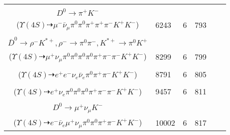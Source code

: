 \documentclass[landscape]{article}
\newcounter{rownumbers}
\newcommand\rn{\stepcounter{rownumbers}\arabic{rownumbers}}
\newcommand{\EOLP}{\\ \hline} %
\newcommand{\topoTags}[1]{#1} %
\begin{document}
\begin{longtable}{clcccc}
\rn & \makecell[l]{ $ 
\Upsilon(4S) \rightarrow B^{+} B^{-} ,
B^{+} \rightarrow \rho^{+} \bar{D}^{0} ,
B^{-} \rightarrow \mu^{-} \bar{\nu}_{\mu} D^{*0} ,
\rho^{+} \rightarrow \pi^{0} \pi^{+} ,
\bar{D}^{0} \rightarrow \pi^{-} K^{+} ,
D^{*0} \rightarrow \pi^{0} D^{0} ,
$ \\ $
D^{0} \rightarrow \pi^{+} K^{-} 
$ \\ ($
\Upsilon(4S) \dashrightarrow \mu^{-} \bar{\nu}_{\mu} \pi^{0} \pi^{0} \pi^{+} \pi^{+} \pi^{-} K^{+} K^{-} 
$) } & \topoTags{6243 & }6 & 793 \EOLP

\rn & \makecell[l]{ $ 
\Upsilon(4S) \rightarrow B^{+} B^{-} ,
B^{+} \rightarrow \mu^{+} \nu_{\mu} \bar{D}^{*0} ,
B^{-} \rightarrow \rho^{-} D^{0} ,
\bar{D}^{*0} \rightarrow \pi^{0} \bar{D}^{0} ,
\rho^{-} \rightarrow \pi^{0} \pi^{-} ,
D^{0} \rightarrow \pi^{+} K^{-} ,
$ \\ $
\bar{D}^{0} \rightarrow \rho^{-} K^{*+} ,
\rho^{-} \rightarrow \pi^{0} \pi^{-} ,
K^{*+} \rightarrow \pi^{0} K^{+} 
$ \\ ($
\Upsilon(4S) \dashrightarrow \mu^{+} \nu_{\mu} \pi^{0} \pi^{0} \pi^{0} \pi^{0} \pi^{+} \pi^{-} \pi^{-} K^{+} K^{-} 
$) } & \topoTags{8299 & }6 & 799 \EOLP

\rn & \makecell[l]{ $ 
\Upsilon(4S) \rightarrow B^{+} B^{-} ,
B^{+} \rightarrow e^{+} \nu_{e} \bar{D}^{0} ,
B^{-} \rightarrow \rho^{-} D^{0} ,
\bar{D}^{0} \rightarrow e^{-} \bar{\nu}_{e} K^{+} ,
\rho^{-} \rightarrow \pi^{0} \pi^{-} ,
D^{0} \rightarrow \pi^{+} K^{-} 
$ \\ ($
\Upsilon(4S) \dashrightarrow e^{+} e^{-} \nu_{e} \bar{\nu}_{e} \pi^{0} \pi^{+} \pi^{-} K^{+} K^{-} 
$) } & \topoTags{8791 & }6 & 805 \EOLP

\rn & \makecell[l]{ $ 
\Upsilon(4S) \rightarrow B^{+} B^{-} ,
B^{+} \rightarrow e^{+} \nu_{e} \bar{D}^{0} ,
B^{-} \rightarrow \rho^{-} D^{0} ,
\bar{D}^{0} \rightarrow \pi^{0} \pi^{-} K^{+} ,
\rho^{-} \rightarrow \pi^{0} \pi^{-} ,
D^{0} \rightarrow \pi^{0} \pi^{+} K^{-} 
$ \\ ($
\Upsilon(4S) \dashrightarrow e^{+} \nu_{e} \pi^{0} \pi^{0} \pi^{0} \pi^{+} \pi^{-} \pi^{-} K^{+} K^{-} 
$) } & \topoTags{9457 & }6 & 811 \EOLP

\rn & \makecell[l]{ $ 
\Upsilon(4S) \rightarrow B^{+} B^{-} ,
B^{+} \rightarrow \rho^{+} \bar{D}^{0} ,
B^{-} \rightarrow e^{-} \bar{\nu}_{e} D^{*0} ,
\rho^{+} \rightarrow \pi^{0} \pi^{+} ,
\bar{D}^{0} \rightarrow \pi^{-} K^{+} ,
D^{*0} \rightarrow \pi^{0} D^{0} ,
$ \\ $
D^{0} \rightarrow \mu^{+} \nu_{\mu} K^{-} 
$ \\ ($
\Upsilon(4S) \dashrightarrow e^{-} \bar{\nu}_{e} \mu^{+} \nu_{\mu} \pi^{0} \pi^{0} \pi^{+} \pi^{-} K^{+} K^{-} 
$) } & \topoTags{10002 & }6 & 817 \EOLP


\end{longtable}
\end{document}
